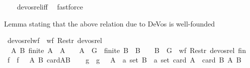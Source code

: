 \begin{isabellebody}
%
\isadelimproof
\ \ %
\endisadelimproof
%
\isatagproof
{}\isamarkupfalse%
\ devos{\isacharunderscore}{\kern0pt}rel{\isacharunderscore}{\kern0pt}iff\ \isamarkupfalse%
\ fastforce%
\endisatagproof
{\isafoldproof}%
%
\isadelimproof
%
\endisadelimproof
%
\begin{isamarkuptext}%
Lemma stating that the above relation due to DeVos is well-founded%
\end{isamarkuptext}\isamarkuptrue%
\isamarkupfalse%
\ devos{\isacharunderscore}{\kern0pt}rel{\isacharunderscore}{\kern0pt}wf\ {\isacharcolon}{\kern0pt}\ {\isachardoublequoteopen}wf\ {\isacharparenleft}{\kern0pt}Restr\ devos{\isacharunderscore}{\kern0pt}rel\ \isanewline
\ \ {\isacharbraceleft}{\kern0pt}{\isacharparenleft}{\kern0pt}A{\isacharcomma}{\kern0pt}\ B{\isacharparenright}{\kern0pt}{\isachardot}{\kern0pt}\ finite\ A\ {\isasymand}\ A\ {\isasymnoteq}\ {\isacharbraceleft}{\kern0pt}{\isacharbraceright}{\kern0pt}\ {\isasymand}\ A\ {\isasymsubseteq}\ G\ {\isasymand}\ finite\ B\ {\isasymand}\ B\ {\isasymnoteq}\ {\isacharbraceleft}{\kern0pt}{\isacharbraceright}{\kern0pt}\ {\isasymand}\ B\ {\isasymsubseteq}\ G{\isacharbraceright}{\kern0pt}{\isacharparenright}{\kern0pt}{\isachardoublequoteclose}\ {\isacharparenleft}{\kern0pt}\ {\isachardoublequoteopen}wf\ {\isacharparenleft}{\kern0pt}Restr\ devos{\isacharunderscore}{\kern0pt}rel\ {\isacharquery}{\kern0pt}fin{\isacharparenright}{\kern0pt}{\isachardoublequoteclose}{\isacharparenright}{\kern0pt}\isanewline
%
\isadelimproof
%
\endisadelimproof
%
\isatagproof
{}\isamarkupfalse%
{\isacharminus}{\kern0pt}\isanewline
\ \ \isamarkupfalse%
\ f\ \ {\isachardoublequoteopen}f\ {\isacharequal}{\kern0pt}\ {\isacharparenleft}{\kern0pt}{\isasymlambda}\ {\isacharparenleft}{\kern0pt}A{\isacharcomma}{\kern0pt}\ B{\isacharparenright}{\kern0pt}{\isachardot}{\kern0pt}\ card{\isacharparenleft}{\kern0pt}A{\isasymcdots}B{\isacharparenright}{\kern0pt}{\isacharparenright}{\kern0pt}{\isachardoublequoteclose}\isanewline
\ \ \isamarkupfalse%
\ g\ \ {\isachardoublequoteopen}g\ {\isacharequal}{\kern0pt}\ {\isacharparenleft}{\kern0pt}{\isasymlambda}\ {\isacharparenleft}{\kern0pt}A\ {\isacharcolon}{\kern0pt}{\isacharcolon}{\kern0pt}\ {\isacharprime}{\kern0pt}a\ set{\isacharcomma}{\kern0pt}\ B\ {\isacharcolon}{\kern0pt}{\isacharcolon}{\kern0pt}\ {\isacharprime}{\kern0pt}a\ set{\isacharparenright}{\kern0pt}{\isachardot}{\kern0pt}\ {\isacharparenleft}{\kern0pt}card\ A\ {\isacharplus}{\kern0pt}\ card\ B{\isacharcomma}{\kern0pt}\ {\isacharparenleft}{\kern0pt}A{\isacharcomma}{\kern0pt}\ B{\isacharparenright}{\kern0pt}{\isacharparenright}{\kern0pt}{\isacharparenright}{\kern0pt}{\isachardoublequoteclose}\isanewline

\end{isabellebody}
